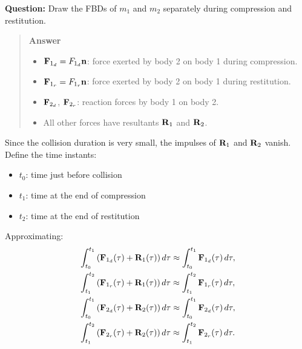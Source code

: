 \documentclass[
  letterpaper,
  DIV=11,
  numbers=noendperiod]{scrreprt}
\providecommand{\tightlist}{%
  \setlength{\itemsep}{0pt}\setlength{\parskip}{0pt}}
\newcommand{\lp}{\left(}
\newcommand{\rp}{\right)}
\begin{document}
\begin{tcolorbox}[enhanced jigsaw, arc=.35mm, bottomrule=.15mm, bottomtitle=1mm, breakable, colback=white, colbacktitle=quarto-callout-tip-color!10!white, colframe=quarto-callout-tip-color-frame, coltitle=black, left=2mm, leftrule=.75mm, opacityback=0, opacitybacktitle=0.6, rightrule=.15mm, title=\textcolor{quarto-callout-tip-color}{\faLightbulb}\hspace{0.5em}{Think!}, titlerule=0mm, toprule=.15mm, toptitle=1mm]

\textbf{Question:} Draw the FBDs of \(m_1\) and \(m_2\) separately
during compression and restitution.

\begin{quote}
\textbf{Answer}

\begin{itemize}
\tightlist
\item
  \({\bf F}_{1_d} = F_{1_d}{\bf n}\): force exerted by body 2 on body 1
  during compression.
\item
  \({\bf F}_{1_r} = F_{1_r}{\bf n}\): force exerted by body 2 on body 1
  during restitution.
\item
  \({\bf F}_{2_d}\), \({\bf F}_{2_r}\): reaction forces by body 1 on
  body 2.
\item
  All other forces have resultants \({\bf R}_1\) and \({\bf R}_2\).
\end{itemize}
\end{quote}

\end{tcolorbox}

Since the collision duration is very small, the impulses of
\({\bf R}_1\) and \({\bf R}_2\) vanish. Define the time instants:

\begin{itemize}
\tightlist
\item
  \(t_0\): time just before collision
\item
  \(t_1\): time at the end of compression
\item
  \(t_2\): time at the end of restitution
\end{itemize}

Approximating: \begin{align}
    \begin{split}
        & \int_{t_0}^{t_1}\lp{\bf F}_{1_d}(\tau)+{\bf R}_1(\tau)\rp d\tau \approx \int_{t_0}^{t_1}{\bf F}_{1_d}(\tau)\,d\tau,\\
        & \int_{t_1}^{t_2}\lp{\bf F}_{1_r}(\tau)+{\bf R}_1(\tau)\rp d\tau \approx \int_{t_1}^{t_2}{\bf F}_{1_r}(\tau)\,d\tau,\\
        & \int_{t_0}^{t_1}\lp{\bf F}_{2_d}(\tau)+{\bf R}_2(\tau)\rp d\tau \approx \int_{t_0}^{t_1}{\bf F}_{2_d}(\tau)\,d\tau,\\
        & \int_{t_1}^{t_2}\lp{\bf F}_{2_r}(\tau)+{\bf R}_2(\tau)\rp d\tau \approx \int_{t_1}^{t_2}{\bf F}_{2_r}(\tau)\,d\tau.
    \end{split}
\end{align}
\end{document}
